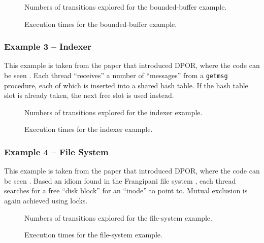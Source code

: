 \documentclass[12pt,a4paper,twoside,openright]{report}
\begin{document}
\begin{figure}
	\centering

	\def\svgwidth{\textwidth}
	
	\caption{Numbers of transitions explored
		for the bounded-buffer example.}
	\label{fig:prod-cons-trans}
	\def\svgwidth{\textwidth}
	
	\caption{Execution times for the
		bounded-buffer example.}
	\label{fig:prod-cons-time}
\end{figure}

\subsubsection{Example 3 -- Indexer}
This example is taken from
the paper that introduced DPOR,
where the code can be seen \cite[Figure~1]{flan05}.
Each thread ``receives'' a number of
``messages'' from a \texttt{getmsg}
procedure, each of which is inserted
into a shared hash table. If the
hash table slot is already taken, the
next free slot is used instead.

\begin{figure}
	\centering

	\def\svgwidth{\textwidth}
	
	\caption{Numbers of transitions explored
		for the indexer example.}
	\label{fig:indexer-trans}

	\def\svgwidth{\textwidth}
	
	\caption{Execution times
		for the indexer example.}
	\label{fig:indexer-time}
\end{figure}

\subsubsection{Example 4 -- File System}
This example is taken from
the paper that introduced DPOR,
where the code can be seen \cite[Figure~7]{flan05}.
Based an idiom found in the Frangipani file
system \cite{thek97}, each thread searches for a free
``disk block'' for an ``inode'' to point
to. Mutual exclusion is again achieved using
locks.

\begin{figure}
	\def\svgwidth{\textwidth}
	
	\caption{Numbers of transitions explored
		for the file-system example.}
	\label{fig:fs-trans}

	\def\svgwidth{\textwidth}
	
	\caption{Execution times
		for the file-system example.}
	\label{fig:fs-time}
\end{figure}
\end{document}
